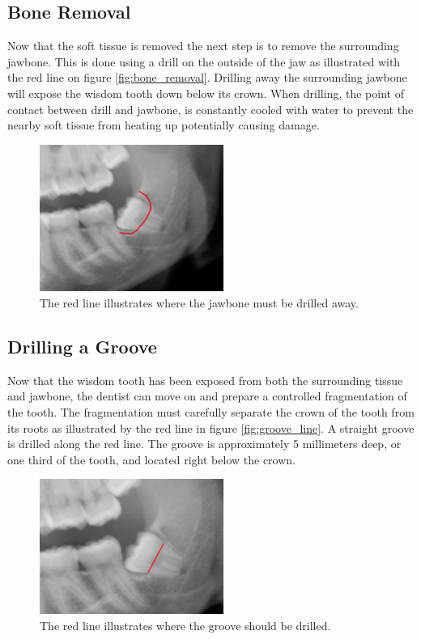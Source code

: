 \subsection*{Bone Removal}
Now that the soft tissue is removed the next step is to remove the
surrounding jawbone. This is done using a drill on the outside of the
jaw as illustrated with the red line on figure
\vref{fig:bone_removal}. Drilling away the surrounding jawbone will
expose the wisdom tooth down below its crown. When drilling, the point
of contact between drill and jawbone, is constantly cooled with 
water to prevent the nearby soft tissue from heating up potentially
causing damage.

\begin{figure}
  \centering
  \includegraphics[width=6cm]{./images/problem_domain_surgery_bone_removal_xray.png}
\caption{The red line illustrates where the jawbone must be drilled
  away. \textdagger}
\label{fig:bone_removal}
\end{figure}

\subsection*{Drilling a Groove}
Now that the wisdom tooth has been exposed from both the surrounding
tissue and jawbone, the dentist can move on and prepare a controlled
fragmentation of the tooth. The fragmentation must carefully separate
the crown of the tooth from its roots as illustrated by the red line
in figure \vref{fig:groove_line}. A straight groove is drilled along
the red line. The groove is approximately 5 millimeters deep, or one
third of the tooth, and located right below the crown. 

\begin{figure}
  \centering
  \includegraphics[width=6cm]{./images/problem_domain_surgery_fragmentation_line.png}
\caption{The red line illustrates where the groove should be drilled. \textdagger}
\label{fig:groove_line}
\end{figure}


